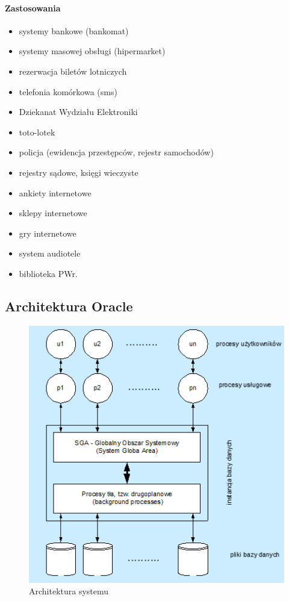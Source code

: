 \documentclass[a4paper,twoside]{report}
\begin{document}
\paragraph{Zastosowania}

\begin{itemize}
\item systemy bankowe (bankomat)
\item systemy masowej obsługi (hipermarket)
\item rezerwacja biletów lotniczych
\item telefonia komórkowa (sms)
\item Dziekanat Wydziału Elektroniki
\item toto-lotek
\item policja (ewidencja przestępców, rejestr samochodów)
\item rejestry sądowe, księgi wieczyste
\item ankiety internetowe
\item sklepy internetowe
\item gry internetowe
\item system audiotele
\item biblioteka PWr.

\end{itemize}


\subsection{Architektura Oracle}

\begin{figure}[htbp]
\centering
\includegraphics[scale=0.7]{obrazy/archoracle.png}
\caption{Architektura systemu}
\end{figure}
\end{document}
